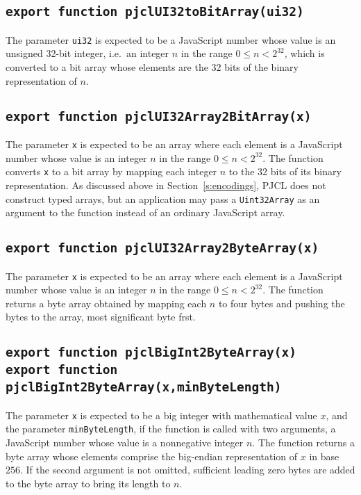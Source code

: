\documentclass[12pt]{article}
\begin{document}
\subsection{\tt export function pjclUI32toBitArray(ui32)}

The parameter {\tt ui32} is expected to be a JavaScript number 
whose value is an unsigned 32-bit integer,
i.e.\ an integer $n$ in the range $0 \leq n < 2^{32}$, which is
converted to a bit array whose elements are the 32 bits of the binary
representation of $n$.

\subsection{\tt export function pjclUI32Array2BitArray(x)}

The parameter {\tt x} is expected to be an array where each element is
a JavaScript number whose value is an integer $n$ in the range $0 \leq
n < 2^{32}$.  The function converts {\tt x} to a bit array by mapping
each integer $n$ to the 32 bits of its binary representation.  As
discussed above in Section~\ref{s:encodings}, PJCL does not construct typed
arrays, but an application may pass a {\tt Uint32Array} as an argument
to the function instead of an ordinary JavaScript array.

\subsection{\tt export function pjclUI32Array2ByteArray(x)}

The parameter {\tt x} is expected to be an array where each element is
a JavaScript number whose value is an integer $n$ in the range $0 \leq
n < 2^{32}$.  The function returns a byte array obtained by mapping
each $n$ to four bytes and pushing
the bytes to the array, most significant byte frst.

\subsection{\tt export function pjclBigInt2ByteArray(x)\\export function pjclBigInt2ByteArray(x,minByteLength)}

The parameter {\tt x} is expected to be a big integer with mathematical value $x$,
and the parameter {\tt minByteLength}, if the function is called with two
arguments, a JavaScript number whose value is a nonnegative integer $n$.
The function returns a byte array whose elements comprise the big-endian 
representation of $x$ in base $256$.  If the second argument is not omitted,
sufficient leading zero bytes are added to the byte array to bring its length
to $n$.
\end{document}

